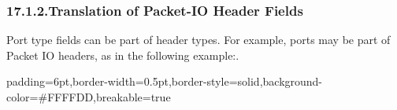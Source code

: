 \documentclass[11pt]{article}
\begin{document}
{%
\subsubsection{17.1.2.\hspace*{0.5em}Translation of Packet-IO Header Fields}\label{sec-translation-of-packet-io-header-fields}%

\noindent{}Port type fields can be part of header types. For example, ports may be part of
Packet IO headers, as in the following example:.%

\begin{mdbmargintb}{6pt}{6pt}%
\begin{mdblock}{padding=6pt,border-width=0.5pt,border-style=solid,background-color=\#FFFFDD,breakable=true}%
\begin{mdpre}%
\end{mdpre}%
\end{mdblock}%
\end{mdbmargintb}%

}
\end{document}
